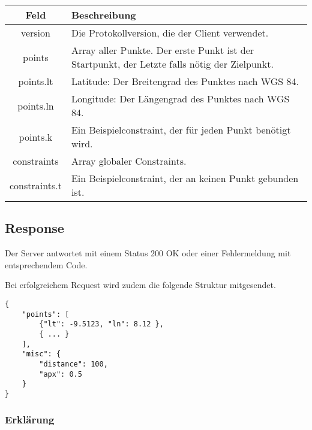 \documentclass[ngerman]{scrartcl}
\begin{document}
	    \noindent \begin{tabular}{|c|p{12cm}|}
	    	\hline
	    	\textbf{Feld} & \textbf{Beschreibung} \\ 
	    	\hline \hline
	    	
	    	version & Die Protokollversion, die der Client verwendet.\\
	    	\hline
	    	
	    	points & Array aller Punkte. Der erste Punkt ist der Startpunkt, der Letzte falls nötig der Zielpunkt. \\ 
	    	\hline
	    	
	    	points.lt & Latitude: Der Breitengrad des Punktes nach WGS 84. \\ 
	    	\hline
	    	
	    	points.ln & Longitude: Der Längengrad des Punktes nach WGS 84. \\
	    	\hline
	    	
	    	points.k & Ein Beispielconstraint, der für jeden Punkt benötigt wird.\\ 
	    	\hline
	    	
	    	constraints & Array globaler Constraints.\\ 
	    	\hline
	    	
	    	constraints.t & Ein Beispielconstraint, der an keinen Punkt gebunden ist.\\ 
	    	\hline
	    \end{tabular}
    
	\subsection*{Response}
	
	Der Server antwortet mit einem Status 200 OK oder einer Fehlermeldung mit entsprechendem Code.
	
	Bei erfolgreichem Request wird zudem die folgende Struktur mitgesendet.
	
	\begin{lstlisting}
{
	"points": [
		{"lt": -9.5123, "ln": 8.12 },
		{ ... }
	],
	"misc": {
		"distance": 100,
		"apx": 0.5
	}
}
	\end{lstlisting}
	
		\subsubsection*{Erklärung}
		
\end{document}
